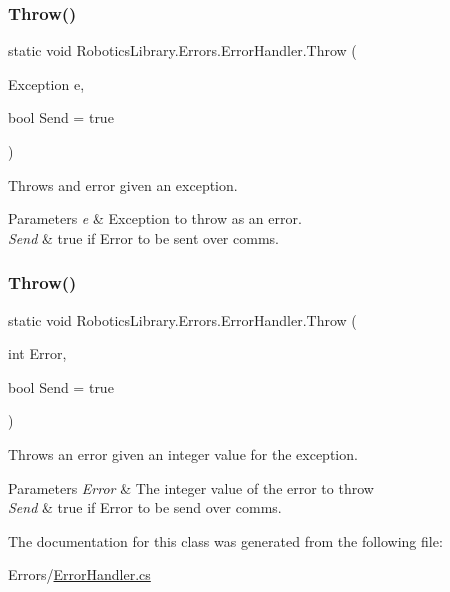 \subsubsection{\texorpdfstring{Throw()}{Throw()}\hspace{0.1cm}{\footnotesize\ttfamily [1/2]}}
{\footnotesize\ttfamily static void Robotics\+Library.\+Errors.\+Error\+Handler.\+Throw (\begin{DoxyParamCaption}\item[{Exception}]{e,  }\item[{bool}]{Send = {\ttfamily true} }\end{DoxyParamCaption})\hspace{0.3cm}{\ttfamily [static]}}



Throws and error given an exception. 


\begin{DoxyParams}{Parameters}
{\em e} & Exception to throw as an error.\\
\hline
{\em Send} & true if Error to be sent over comms.\\
\hline
\end{DoxyParams}
\mbox{\label{class_robotics_library_1_1_errors_1_1_error_handler_a3d2861114cd4e8cc38cd8c5a8c539a0e}} 
\subsubsection{\texorpdfstring{Throw()}{Throw()}\hspace{0.1cm}{\footnotesize\ttfamily [2/2]}}
{\footnotesize\ttfamily static void Robotics\+Library.\+Errors.\+Error\+Handler.\+Throw (\begin{DoxyParamCaption}\item[{int}]{Error,  }\item[{bool}]{Send = {\ttfamily true} }\end{DoxyParamCaption})\hspace{0.3cm}{\ttfamily [static]}}



Throws an error given an integer value for the exception. 


\begin{DoxyParams}{Parameters}
{\em Error} & The integer value of the error to throw\\
\hline
{\em Send} & true if Error to be send over comms.\\
\hline
\end{DoxyParams}


The documentation for this class was generated from the following file\+:\begin{DoxyCompactItemize}
\item 
Errors/\hyperlink{_error_handler_8cs}{Error\+Handler.\+cs}\end{DoxyCompactItemize}
